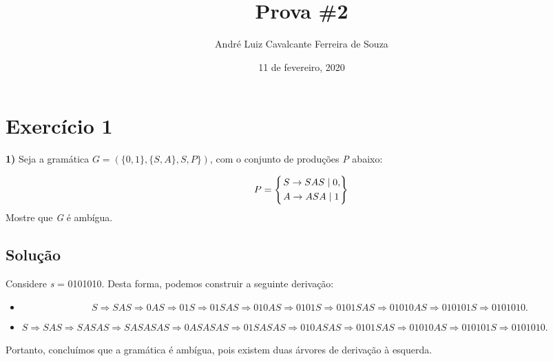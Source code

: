 \documentclass[11pt,portuguese]{fphw}
\title{Prova \#2}
\author{André Luiz Cavalcante Ferreira de Souza}
\date{11 de fevereiro, 2020}
\institute{Instituto de Informática - Universidade Federal de Goiás}
\begin{document}
		\maketitle
		
		\section*{Exercício 1}
		\begin{problem}
			\textbf{1) }Seja a gramática $G = ( \{0, 1\}, \{S, A\}, S, P\} )$, com o conjunto de produções \textit{P} abaixo:
			
			$$
			P = 
			\begin{dcases}
				\begin{rcases}
				 S \rightarrow SAS \mid 0,
				 \\
				 A \rightarrow ASA \mid 1
				 \end{rcases}
			\end{dcases}
			$$
			\linebreak
			Mostre que \textit{G} é ambígua.
		\end{problem}
			\subsection*{Solução}
				Considere \textit{s} = 0101010. Desta forma, podemos construir a seguinte
				derivação:
				
				\begin{itemize}
					\item
						\begin{equation*}
						S \Rightarrow SAS \Rightarrow 0AS \Rightarrow 01S \Rightarrow
						01SAS 
						\Rightarrow 010AS \Rightarrow 0101S \Rightarrow 0101SAS 
						\Rightarrow 01010AS \Rightarrow 010101S 
						\Rightarrow 0101010.
						\end{equation*}
						
					\item$
						S \Rightarrow SAS \Rightarrow SASAS \Rightarrow SASASAS
						\Rightarrow 0ASASAS \Rightarrow 01SASAS \Rightarrow 010ASAS 
						\Rightarrow 0101SAS \Rightarrow 01010AS \Rightarrow 010101S 
						\Rightarrow 0101010.
					$
				\end{itemize}
				
				Portanto, concluímos que a gramática é ambígua, pois existem duas árvores
				de derivação à esquerda.
			
\end{document}
